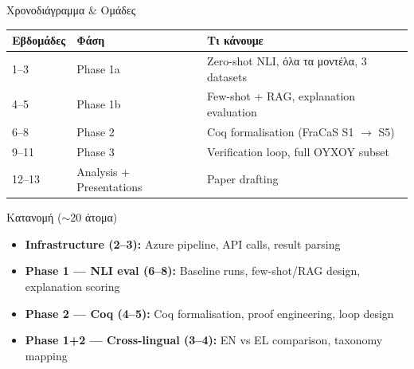 \documentclass[aspectratio=169,10pt]{beamer}
\begin{document}
\begin{frame}{Χρονοδιάγραμμα \& Ομάδες}
	\begin{center}
		\small
		\begin{tabular}{lll}
			\toprule
			\textbf{Εβδομάδες} & \textbf{Φάση} & \textbf{Τι κάνουμε} \\
			\midrule
			1--3 & Phase 1a & Zero-shot NLI, όλα τα μοντέλα, 3 datasets \\
			4--5 & Phase 1b & Few-shot + RAG, explanation evaluation \\
			6--8 & Phase 2 & Coq formalisation (FraCaS S1 $\to$ S5) \\
			9--11 & Phase 3 & Verification loop, full OYXOY subset \\
			12--13 & Analysis + Presentations & Paper drafting \\
			\bottomrule
		\end{tabular}
	\end{center}
	\vspace{0.2cm}
	\begin{block}{Κατανομή ($\sim$20 άτομα)}
		\begin{itemize}
			\item \textbf{Infrastructure (2--3):} Azure pipeline, API calls, result parsing
			\item \textbf{Phase 1 --- NLI eval (6--8):} Baseline runs, few-shot/RAG design, explanation scoring
			\item \textbf{Phase 2 --- Coq (4--5):} Coq formalisation, proof engineering, loop design
			\item \textbf{Phase 1+2 --- Cross-lingual (3--4):} EN vs EL comparison, taxonomy mapping
		\end{itemize}
	\end{block}
\end{frame}
\end{document}
